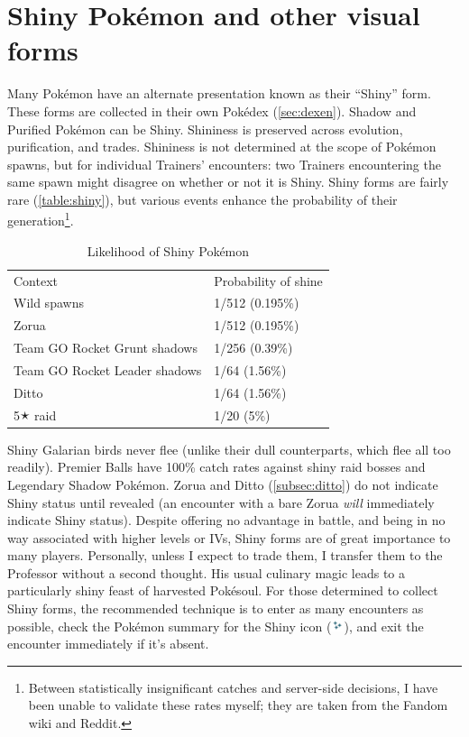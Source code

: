 \section{Shiny Pokémon and other visual forms}
\label{sec:shiny}
Many Pokémon have an alternate presentation known as their ``Shiny'' form.
These forms are collected in their own Pokédex (\autoref{sec:dexen}).
Shadow and Purified Pokémon can be Shiny.
Shininess is preserved across evolution, purification, and trades.
Shininess is not determined at the scope of Pokémon spawns, but for individual
  Trainers' encounters: two Trainers encountering the same spawn might disagree
  on whether or not it is Shiny.
Shiny forms are fairly rare (\autoref{table:shiny}), but various events
  enhance the probability of their generation\footnote{Between statistically insignificant catches and server-side decisions, I have been unable to validate these rates myself; they are taken from the Fandom wiki and Reddit.}.
\begin{table}
\centering
\begin{tabular}{ll}
Context & Probability of shine \\
\Midrule
  Wild spawns & 1/512 (0.195\%) \\
  Zorua & 1/512 (0.195\%) \\
  Team GO Rocket Grunt shadows & 1/256 (0.39\%) \\
  Team GO Rocket Leader shadows & 1/64 (1.56\%) \\
  Ditto & 1/64 (1.56\%)\\
  5🟉 raid & 1/20 (5\%) \\
\end{tabular}
\caption{Likelihood of Shiny Pokémon}
\label{table:shiny}
\end{table}
Shiny Galarian birds never flee (unlike their dull counterparts, which flee all too readily).
Premier Balls have 100\% catch rates against shiny raid bosses and Legendary Shadow Pokémon.
Zorua and Ditto (\autoref{subsec:ditto}) do not indicate Shiny status until revealed (an encounter
  with a bare Zorua \textit{will} immediately indicate Shiny status).
Despite offering no advantage in battle, and being in no way associated with
  higher levels or IVs, Shiny forms are of great importance to many players.
Personally, unless I expect to trade them, I transfer them to the Professor
  without a second thought.
His usual culinary magic leads to a particularly shiny feast of harvested Pokésoul.
For those determined to collect Shiny forms, the recommended technique
  is to enter as many encounters as possible, check the Pokémon summary
  for the Shiny icon (\includegraphics[width=1em,keepaspectratio]{images/shiny.png}),
  and exit the encounter immediately if it's absent.

